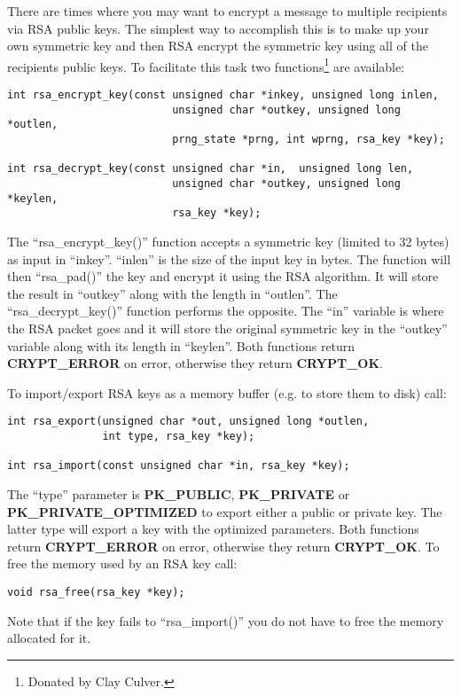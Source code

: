 \documentclass{book}
\begin{document}
There are times where you may want to encrypt a message to multiple recipients via RSA public keys.  The simplest way to
accomplish this is to make up your own symmetric key and then RSA encrypt the symmetric key using all of the recipients
public keys.  To facilitate this task two functions\footnote{Donated by Clay Culver.} are available:
\begin{verbatim}
int rsa_encrypt_key(const unsigned char *inkey, unsigned long inlen,
                          unsigned char *outkey, unsigned long *outlen,
                          prng_state *prng, int wprng, rsa_key *key);

int rsa_decrypt_key(const unsigned char *in,  unsigned long len, 
                          unsigned char *outkey, unsigned long *keylen,
                          rsa_key *key);
\end{verbatim}

The ``rsa\_encrypt\_key()'' function accepts a symmetric key (limited to 32 bytes) as input in ``inkey''.  ``inlen''
is the size of the input key in bytes.  The function will then ``rsa\_pad()'' the key and encrypt it using the RSA
algorithm.  It will store the result in ``outkey'' along with the length in ``outlen''.  The ``rsa\_decrypt\_key()'' function
performs the opposite.  The ``in'' variable is where the RSA packet goes and it will store the original symmetric key in
the ``outkey'' variable along with its length in ``keylen''.  Both functions return {\bf CRYPT\_ERROR} on error, otherwise
they return {\bf CRYPT\_OK}. 

To import/export RSA keys as a memory buffer (e.g. to store them to disk) call:
\begin{verbatim}
int rsa_export(unsigned char *out, unsigned long *outlen, 
               int type, rsa_key *key);

int rsa_import(const unsigned char *in, rsa_key *key);
\end{verbatim}

The ``type'' parameter is {\bf PK\_PUBLIC}, {\bf PK\_PRIVATE} or {\bf PK\_PRIVATE\_OPTIMIZED} to export either a public or 
private key.  The latter type will export a key with the optimized parameters.  Both functions return 
{\bf CRYPT\_ERROR} on error, otherwise they return {\bf CRYPT\_OK}.  To free the memory used by an RSA key call:
\begin{verbatim}
void rsa_free(rsa_key *key);
\end{verbatim}

Note that if the key fails to ``rsa\_import()'' you do not have to free the memory allocated for it.
\end{document}
